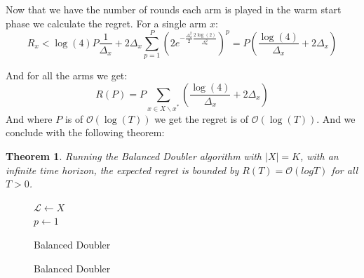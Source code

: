 \documentclass[MSc,beforeExam]{iitcsthesis}
\newtheorem{theorem}{Theorem}
\begin{document}
	Now that we have the number of rounds each arm is played in the warm start phase we calculate the regret.
	For a single arm $x$:
	\begin{equation}
	R_x < \log(4)P\frac{1}{\Delta_x} +2\Delta_x\sum\limits_{p=1}^P \left( 2 e^{-\frac{\Delta^2_x}{2}\frac{2\log(2)}{\Delta^2_x}} \right)^p = P(\frac{\log(4)}{\Delta_x}+2\Delta_x)
	\end{equation}
	
	And for all the arms we get:
	\begin{equation}
	R(P) = P \sum\limits_{x\in X\backslash x^*} (\frac{\log(4)}{\Delta_x}+2\Delta_x)
	\end{equation}
	And where $P$ is of $\mathcal{O}(\log(T))$ we get the regret is of $\mathcal{O}(\log(T))$.
	And we conclude with the following theorem:
	\begin{theorem}
	Running the Balanced Doubler algorithm with $|X|=K$, with an infinite time horizon, the expected regret is bounded by $R(T) = \mathcal{O} \left(log T \right)$ for all $T>0$.
	
	\end{theorem}
	
	 
		
		\begin{figure}[h]
	\IncMargin{1em}
		\begin{algorithm}[H]
		\BlankLine
		$\mathcal{L} \leftarrow X$\\
		$p\leftarrow 1$\\
			\caption{Balanced Doubler}
		\end{algorithm}
		\caption{Balanced Doubler}\label{algo_balanced_doubler}
	\end{figure}
	\newpage
\end{document}
